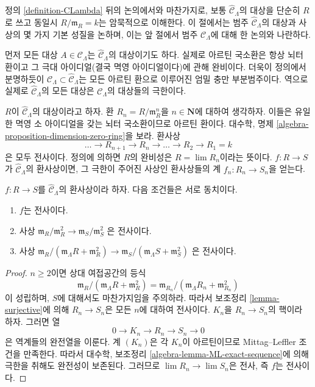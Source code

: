 \noindent
정의 \ref{definition-CLambda} 뒤의 논의에서와 마찬가지로,
보통 $\widehat{\mathcal{C}}_\Lambda$의 대상을 단순히 $R$로 쓰고
동일시 $R/\mathfrak m_R = k$는 암묵적으로 이해한다.
이 절에서는 범주 $\widehat{\mathcal{C}}_\Lambda$의 대상과 사상의 몇 가지
기본 성질을 논하며, 이는 앞 절에서 범주 $\mathcal{C}_\Lambda$에 대해 한
논의와 나란하다.

\medskip\noindent
먼저 모든 대상 $A \in \mathcal{C}_\Lambda$는
$\widehat{\mathcal{C}}_\Lambda$의 대상이기도 하다. 실제로 아르틴 국소환은
항상 뇌터 환이고 그 극대 아이디얼(결국 멱영 아이디얼이다)에 관해 완비이다.
더욱이 정의에서 분명하듯이
$\mathcal{C}_\Lambda \subset \widehat{\mathcal{C}}_\Lambda$는
모든 아르틴 환으로 이루어진 엄밀 충만 부분범주이다.
역으로 실제로 $\widehat{\mathcal{C}}_\Lambda$의 모든 대상은
$\mathcal{C}_\Lambda$의 대상들의 극한이다.

\medskip\noindent
$R$이 $\widehat{\mathcal{C}}_\Lambda$의 대상이라고 하자.
환 $R_n = R/\mathfrak m_R^n$을 $n \in \mathbf{N}$에 대하여 생각하자.
이들은 유일한 멱영 소 아이디얼을 갖는 뇌터 국소환이므로 아르틴 환이다.
대수학, 명제 \ref{algebra-proposition-dimension-zero-ring}을 보라.
환사상
$$
\ldots \to R_{n + 1} \to R_n \to \ldots \to R_2 \to R_1 = k
$$
은 모두 전사이다. 정의에 의하면 $R$의 완비성은
$R = \lim R_n$이라는 뜻이다. $f : R \to S$가
$\widehat{\mathcal{C}}_\Lambda$의 환사상이면, 그 극한이 주어진 사상인
환사상들의 계 $f_n : R_n \to S_n$을 얻는다.

\begin{lemma}
\label{lemma-surjective-cotangent-space}
$f: R \to S$를 $\widehat{\mathcal{C}}_\Lambda$의 환사상이라 하자.
다음 조건들은 서로 동치이다.
\begin{enumerate}
\item $f$는 전사이다.
\item 사상
$\mathfrak m_R/\mathfrak m_R^2 \to \mathfrak m_S/\mathfrak m_S^2$
은 전사이다.
\item 사상
$\mathfrak m_R/(\mathfrak m_\Lambda R + \mathfrak m_R^2) \to
\mathfrak m_S/(\mathfrak m_\Lambda S + \mathfrak m_S^2)$
은 전사이다.
\end{enumerate}
\end{lemma}

\begin{proof}
$n \geq 2$이면 상대 여접공간의 등식
$$
\mathfrak m_R/(\mathfrak m_\Lambda R + \mathfrak m_R^2)
=
\mathfrak m_{R_n}/(\mathfrak m_\Lambda R_n + \mathfrak m_{R_n}^2)
$$
이 성립하며, $S$에 대해서도 마찬가지임을 주의하라.
따라서 보조정리 \ref{lemma-surjective}에 의해
$R_n \to S_n$은 모든 $n$에 대하여 전사이다.
$K_n$을 $R_n \to S_n$의 핵이라 하자. 그러면 열
$$
0 \to K_n \to R_n \to S_n \to 0
$$
은 역계들의 완전열을 이룬다. 계 $(K_n)$은 각 $K_n$이 아르틴이므로
Mittag--Leffler 조건을 만족한다. 따라서 대수학, 보조정리
\ref{algebra-lemma-ML-exact-sequence}에 의해 극한을 취해도 완전성이
보존된다. 그러므로 $\lim R_n \to \lim S_n$은 전사, 즉 $f$는 전사이다.
\end{proof}


